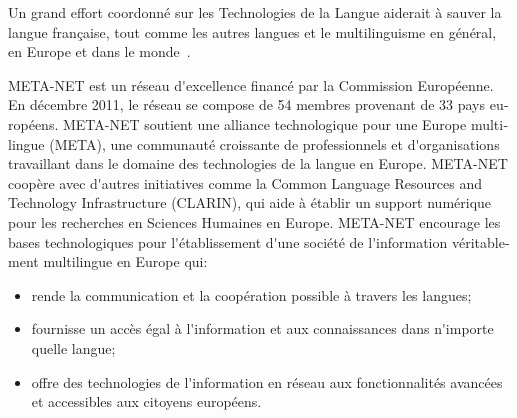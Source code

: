 \documentclass[]{../metanetpaper}
\begin{document}
\begin{french}
\begin{multicols}{2}
Un grand effort coordonné sur les Technologies de la Langue aiderait à
sauver la langue française, tout comme les autres langues et le
multilinguisme en général, en Europe et dans le monde~\cite{worldconclusion}.

\end{multicols}

\clearpage


\begin{multicols}{2}
META-NET est un réseau d{\mbox '}excellence financé par la Commission Européenne. En décembre 2011, le réseau se compose de 54 membres provenant de 33 pays européens. META-NET soutient une alliance technologique pour une Europe multilingue (META), une communauté croissante de professionnels et d{\mbox '}organisations travaillant dans le domaine des technologies de la langue en Europe. META-NET coopère avec d{\mbox '}autres initiatives comme la Common Language Resources and Technology Infrastructure  (CLARIN), qui aide à établir un support numérique pour les recherches en Sciences Humaines en Europe. META-NET encourage les bases technologiques pour l{\mbox '}établissement d{\mbox '}une société de l{\mbox '}information véritablement multilingue en Europe qui:

\begin{itemize}
\item rende la communication et la coopération possible à travers les langues; 
\item fournisse un accès égal à l{\mbox '}information et aux connaissances dans n{\mbox '}importe quelle langue; 
\item offre des technologies de l{\mbox '}information en réseau aux fonctionnalités avancées et accessibles aux citoyens européens.
\end{itemize}


\end{multicols}
\end{french}
\end{document}

